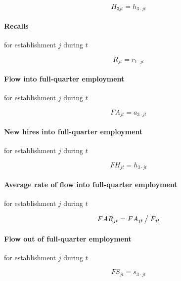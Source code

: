 \begin{equation}
H_{3jt}=h_{3\cdot jt}
\end{equation}

\paragraph{Recalls}

for establishment $j$ during $t$

\begin{equation}
R_{jt} = r_{1\cdot jt}
\end{equation}

\paragraph{Flow into full-quarter employment}

for establishment $j$ during $t$

\begin{equation}
FA_{jt}=a_{3\cdot jt}
\end{equation}

\paragraph{New hires into full-quarter employment}

for establishment $j$ during $t$

\begin{equation}
FH_{jt}=h_{3\cdot jt}
\end{equation}

\paragraph{Average rate of flow into full-quarter employment}

for establishment $j$ during $t$

\begin{equation}
FAR_{jt} = {FA_{jt} } \left/ {\vphantom {{FA_{jt} } {\bar {F}_{jt} }}}
\right. {\bar {F}_{jt} }
\end{equation}

\paragraph{Flow out of full-quarter employment}

for establishment $j$ during $t$

\begin{equation}
FS_{jt} = s_{3\cdot jt}
\end{equation}

